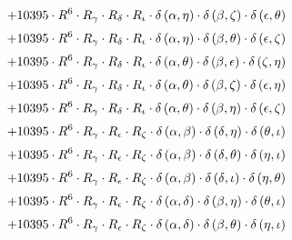 \begin{subequations}
\begin{gather}
 \\[0.2em] \notag 		 + 10395 \cdot R^{6} \cdot R_{\gamma{}} \cdot R_{\delta{}} \cdot R_{\iota{}} \cdot \delta{}\left(\alpha{}, \eta{}\right) \cdot \delta{}\left(\beta{}, \zeta{}\right) \cdot \delta{}\left(\epsilon{}, \theta{}\right) 
 \\[0.2em] \notag 		 + 10395 \cdot R^{6} \cdot R_{\gamma{}} \cdot R_{\delta{}} \cdot R_{\iota{}} \cdot \delta{}\left(\alpha{}, \eta{}\right) \cdot \delta{}\left(\beta{}, \theta{}\right) \cdot \delta{}\left(\epsilon{}, \zeta{}\right) 
 \\[0.2em] \notag 		 + 10395 \cdot R^{6} \cdot R_{\gamma{}} \cdot R_{\delta{}} \cdot R_{\iota{}} \cdot \delta{}\left(\alpha{}, \theta{}\right) \cdot \delta{}\left(\beta{}, \epsilon{}\right) \cdot \delta{}\left(\zeta{}, \eta{}\right) 
 \\[0.2em] \notag 		 + 10395 \cdot R^{6} \cdot R_{\gamma{}} \cdot R_{\delta{}} \cdot R_{\iota{}} \cdot \delta{}\left(\alpha{}, \theta{}\right) \cdot \delta{}\left(\beta{}, \zeta{}\right) \cdot \delta{}\left(\epsilon{}, \eta{}\right) 
 \\[0.2em] \notag 		 + 10395 \cdot R^{6} \cdot R_{\gamma{}} \cdot R_{\delta{}} \cdot R_{\iota{}} \cdot \delta{}\left(\alpha{}, \theta{}\right) \cdot \delta{}\left(\beta{}, \eta{}\right) \cdot \delta{}\left(\epsilon{}, \zeta{}\right) 
 \\[0.2em] \notag 		 + 10395 \cdot R^{6} \cdot R_{\gamma{}} \cdot R_{\epsilon{}} \cdot R_{\zeta{}} \cdot \delta{}\left(\alpha{}, \beta{}\right) \cdot \delta{}\left(\delta{}, \eta{}\right) \cdot \delta{}\left(\theta{}, \iota{}\right) 
 \\[0.2em] \notag 		 + 10395 \cdot R^{6} \cdot R_{\gamma{}} \cdot R_{\epsilon{}} \cdot R_{\zeta{}} \cdot \delta{}\left(\alpha{}, \beta{}\right) \cdot \delta{}\left(\delta{}, \theta{}\right) \cdot \delta{}\left(\eta{}, \iota{}\right) 
 \\[0.2em] \notag 		 + 10395 \cdot R^{6} \cdot R_{\gamma{}} \cdot R_{\epsilon{}} \cdot R_{\zeta{}} \cdot \delta{}\left(\alpha{}, \beta{}\right) \cdot \delta{}\left(\delta{}, \iota{}\right) \cdot \delta{}\left(\eta{}, \theta{}\right) 
 \\[0.2em] \notag 		 + 10395 \cdot R^{6} \cdot R_{\gamma{}} \cdot R_{\epsilon{}} \cdot R_{\zeta{}} \cdot \delta{}\left(\alpha{}, \delta{}\right) \cdot \delta{}\left(\beta{}, \eta{}\right) \cdot \delta{}\left(\theta{}, \iota{}\right) 
 \\[0.2em] \notag 		 + 10395 \cdot R^{6} \cdot R_{\gamma{}} \cdot R_{\epsilon{}} \cdot R_{\zeta{}} \cdot \delta{}\left(\alpha{}, \delta{}\right) \cdot \delta{}\left(\beta{}, \theta{}\right) \cdot \delta{}\left(\eta{}, \iota{}\right) 

\end{gather}
\end{subequations}
